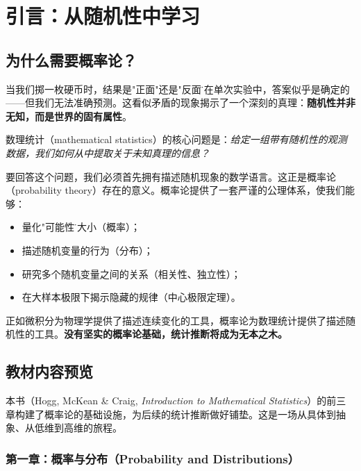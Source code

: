 \chapter*{引言：从随机性中学习}\label{chap:intro}

\section{为什么需要概率论？}\label{sec:why-probability}

当我们掷一枚硬币时，结果是"正面"还是"反面\"？在单次实验中，答案似乎是确定的——但我们无法准确预测。这看似矛盾的现象揭示了一个深刻的真理：\textbf{随机性并非无知，而是世界的固有属性}。

数理统计（mathematical statistics）的核心问题是：\textit{给定一组带有随机性的观测数据，我们如何从中提取关于未知真理的信息？}

要回答这个问题，我们必须首先拥有描述随机现象的数学语言。这正是概率论（probability theory）存在的意义。概率论提供了一套严谨的公理体系，使我们能够：
\begin{itemize}
    \item 量化"可能性\"的大小（概率）；
    \item 描述随机变量的行为（分布）；
    \item 研究多个随机变量之间的关系（相关性、独立性）；
    \item 在大样本极限下揭示隐藏的规律（中心极限定理）。
\end{itemize}

正如微积分为物理学提供了描述连续变化的工具，概率论为数理统计提供了描述随机性的工具。\textbf{没有坚实的概率论基础，统计推断将成为无本之木。}


\section{教材内容预览}\label{sec:textbook-preview}

本书（Hogg, McKean \& Craig, \textit{Introduction to Mathematical Statistics}）的前三章构建了概率论的基础设施，为后续的统计推断做好铺垫。这是一场从具体到抽象、从低维到高维的旅程。

\subsection{第一章：概率与分布（Probability and Distributions）}\label{sec:ch1-preview}

